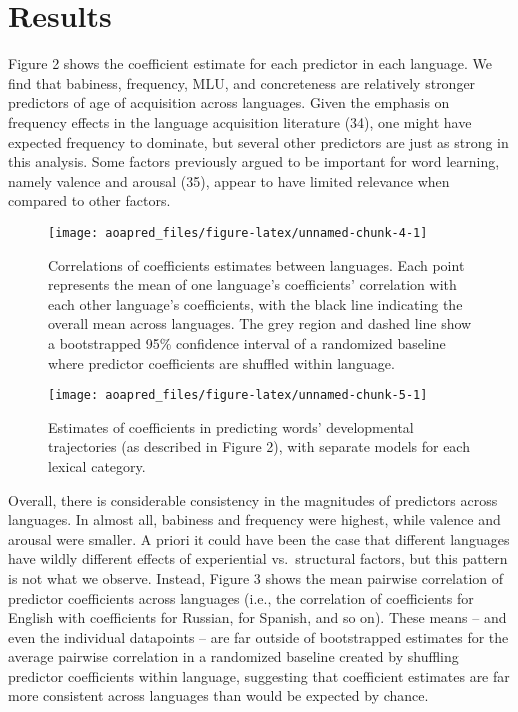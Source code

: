 \documentclass[english,man]{apa6}
\theoremstyle{definition}
\theoremstyle{definition}
\theoremstyle{definition}
\theoremstyle{remark}
\begin{document}
\section*{Results}\label{results}

Figure 2 shows the coefficient estimate for each predictor in each
language. We find that babiness, frequency, MLU, and concreteness are
relatively stronger predictors of age of acquisition across languages.
Given the emphasis on frequency effects in the language acquisition
literature (34), one might have expected frequency to dominate, but
several other predictors are just as strong in this analysis. Some
factors previously argued to be important for word learning, namely
valence and arousal (35), appear to have limited relevance when compared
to other factors.

\begin{figure}

{\centering \texttt{[image: aoapred\_files/figure-latex/unnamed-chunk-4-1]} 

}

\caption{Correlations of coefficients estimates between languages. Each point represents the mean of one language's coefficients' correlation with each other language's coefficients, with the black line indicating the overall mean across languages. The grey region and dashed line show a bootstrapped 95\% confidence interval of a randomized baseline where predictor coefficients are shuffled within language.}\label{fig:unnamed-chunk-4}
\end{figure}

\begin{figure*}

{\centering \texttt{[image: aoapred\_files/figure-latex/unnamed-chunk-5-1]} 

}

\caption{Estimates of coefficients in predicting words' developmental trajectories (as described in Figure 2), with separate models for each lexical category.}\label{fig:unnamed-chunk-5}
\end{figure*}

Overall, there is considerable consistency in the magnitudes of
predictors across languages. In almost all, babiness and frequency were
highest, while valence and arousal were smaller. A priori it could have
been the case that different languages have wildly different effects of
experiential vs.~structural factors, but this pattern is not what we
observe. Instead, Figure 3 shows the mean pairwise correlation of
predictor coefficients across languages (i.e., the correlation of
coefficients for English with coefficients for Russian, for Spanish, and
so on). These means -- and even the individual datapoints -- are far
outside of bootstrapped estimates for the average pairwise correlation
in a randomized baseline created by shuffling predictor coefficients
within language, suggesting that coefficient estimates are far more
consistent across languages than would be expected by chance.
\end{document}
